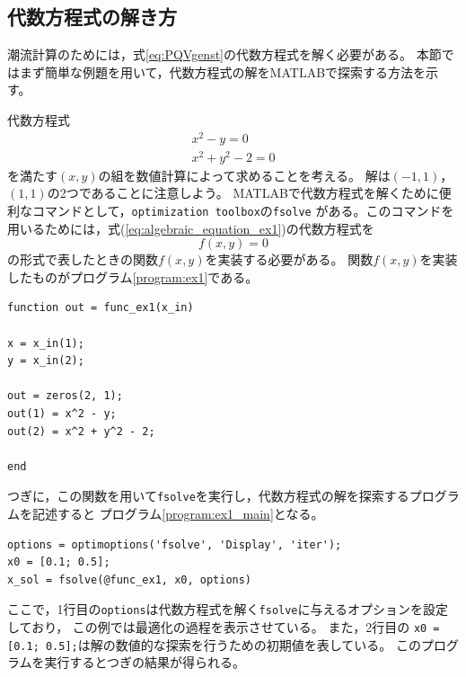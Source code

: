 \documentclass[tombow,dvipdfmx]{corona-a5-1.1}
\begin{document}
\subsection{代数方程式の解き方}
潮流計算のためには，式\ref{eq:PQVgenst}の代数方程式を解く必要がある。
本節ではまず簡単な例題を用いて，代数方程式の解をMATLABで探索する方法を示す。
\begin{例}[代数方程式の解の探索]\label{ex:algenraic_equation_ex1}
代数方程式
\begin{subequations}\label{eq:algebraic_equation_ex1}
\begin{align}
x^2 - y = 0\\
x^2 + y^2 - 2 = 0
\end{align}
\end{subequations}
を満たす$(x, y)$の組を数値計算によって求めることを考える。
解は$(-1, 1)$，$(1, 1)$の2つであることに注意しよう。
MATLABで代数方程式を解くために便利なコマンドとして，\verb|optimization toolbox|の\verb|fsolve|
がある。このコマンドを用いるためには，式(\ref{eq:algebraic_equation_ex1})の代数方程式を
\[
f(x,y)=0
\]
の形式で表したときの関数$f(x,y)$を実装する必要がある。
関数$f(x,y)$を実装したものがプログラム\nobreak\ref{program:ex1}である。

\smallskip
\begin{PROGRAMA}[count,title={func\_ex1.m}]\label{program:ex1}
\begin{verbatim}
function out = func_ex1(x_in)

x = x_in(1);
y = x_in(2);

out = zeros(2, 1);
out(1) = x^2 - y;
out(2) = x^2 + y^2 - 2;

end
\end{verbatim}
\end{PROGRAMA}

つぎに，この関数を用いて\verb|fsolve|を実行し，代数方程式の解を探索するプログラムを記述すると
プログラム\nobreak\ref{program:ex1_main}となる。
\smallskip
\begin{PROGRAMA}[count,title={main\_ex1.m}]\label{program:ex1_main}
\begin{verbatim}
options = optimoptions('fsolve', 'Display', 'iter');
x0 = [0.1; 0.5];
x_sol = fsolve(@func_ex1, x0, options)
\end{verbatim}
\end{PROGRAMA}

ここで，1行目の\verb|options|は代数方程式を解く\verb|fsolve|に与えるオプションを設定しており，
この例では最適化の過程を表示させている。
また，2行目の
\verb|x0 = [0.1; 0.5];|は解の数値的な探索を行うための初期値を表している。
このプログラムを実行するとつぎの結果が得られる。


\end{例}
\end{document}

